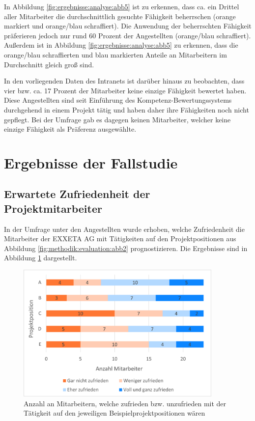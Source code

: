 In Abbildung \ref{fig:ergebnisse:analyse:abb5} ist zu erkennen, dass ca. ein Drittel aller Mitarbeiter die durchschnittlich gesuchte Fähigkeit beherrschen (orange markiert und orange/blau schraffiert). Die Anwendung der beherrschten Fähigkeit präferieren jedoch nur rund 60 Prozent der Angestellten (orange/blau schraffiert). Außerdem ist in Abbildung \ref{fig:ergebnisse:analyse:abb5} zu erkennen, dass die orange/blau schraffierten und blau markierten Anteile an Mitarbeitern im Durchschnitt gleich groß sind.

In den vorliegenden Daten des Intranets ist darüber hinaus zu beobachten, dass vier bzw. ca. 17 Prozent der Mitarbeiter keine einzige Fähigkeit bewertet haben. Diese Angestellten sind seit Einführung des Kompetenz-Bewertungssystems durchgehend in einem Projekt tätig und haben daher ihre Fähigkeiten noch nicht gepflegt. Bei der Umfrage gab es dagegen keinen Mitarbeiter, welcher keine einzige Fähigkeit als Präferenz ausgewählte.

\section{Ergebnisse der Fallstudie}
\label{ch:ergebnisse:fallstudie}

\subsection{Erwartete Zufriedenheit der Projektmitarbeiter}
\label{ch:ergebnisse:fallstudie:umfrageMitarbeiter}
In der Umfrage unter den Angestellten wurde erhoben, welche Zufriedenheit die Mitarbeiter der EXXETA AG mit Tätigkeiten auf den Projektpositionen aus Abbildung \ref{fig:methodik:evaluation:abb2} prognostizieren. Die Ergebnisse sind in Abbildung \ref{fig:ergebnisse:fallstudie:abb1} dargestellt.

\begin{figure}[h]
	\centering
	\includegraphics[width=0.9\textwidth]{gfx/mitarbeiter-zufriedenheit-umfrage.png}
	\caption{Anzahl an Mitarbeitern, welche zufrieden bzw. unzufrieden mit der Tätigkeit auf den jeweiligen Beispielprojektpositionen wären}
	\label{fig:ergebnisse:fallstudie:abb1}
\end{figure}

